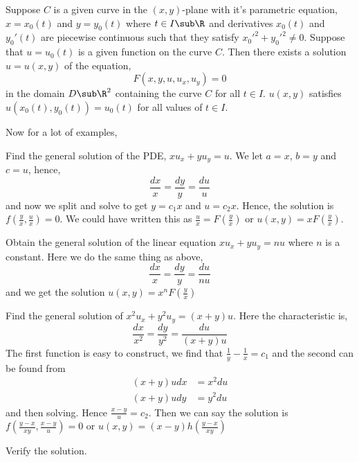 
\begin{nthm}
  Suppose $C$ is a given curve in the $(x, y)$-plane with it's parametric equation, $x = x_0(t)$ and $y = y_0(t)$ where $t \in I \sub \R$ and derivatives $x_0(t)$ and $y_0'(t)$ are piecewise continuous such that they satisfy $x_0'^2 + y_0'^2 \ne 0$. Suppose that $u = u_0(t)$ is a given function on the curve $C$. Then there exists a solution $u = u(x, y)$ of the equation,
  $$ F(x, y, u, u_x, u_y) = 0 $$
  in the domain $D \sub \R^2$ containing the curve $C$ for all $t \in I$. $u(x, y)$ satisfies $u(x_0(t), y_0(t)) = u_0(t)$ for all values of $t \in I$.
\end{nthm}

Now for a lot of examples,
\begin{eg}
  Find the general solution of the PDE, $xu_x + yu_y = u$. We let $a = x$, $b = y$ and $c = u$, hence,
  $$ \frac{dx}{x} = \frac{dy}{y} = \frac{du}{u} $$
  and now we split and solve to get $y = c_1x$ and $u = c_2x$. Hence, the solution is $f\left( \frac{y}{x}, \frac{u}{x} \right) = 0$. We could have written this as $\frac{u}{x} = F\left( \frac{y}{x} \right)$ or $u(x, y) = xF\left( \frac{y}{x} \right)$.
\end{eg}

\begin{eg}
  Obtain the general solution of the linear equation $xu_x + yu_y = nu$ where $n$ is a constant. Here we do the same thing as above,
  $$ \frac{dx}{x} = \frac{dy}{y} = \frac{du}{nu} $$
  and we get the solution $u(x, y) = x^nF\left( \frac{y}{x} \right)$
\end{eg}

\begin{eg}
  Find the general solution of $x^2u_x + y^2u_y = (x + y)u$. Here the characteristic is,
  $$ \frac{dx}{x^2} = \frac{dy}{y^2} = \frac{du}{(x + y)u}$$
  The first function is easy to construct, we find that $\frac{1}{y} - \frac{1}{x} = c_1$ and the second can be found from
  \begin{align}
    (x + y)udx &= x^2du \\
    (x + y)udy &= y^2du
  \end{align}
  and then solving. Hence $\frac{x-y}{u} = c_2$. Then we can say the solution is $f(\frac{y - x}{xy}, \frac{x - y}{u}) = 0$ or $u(x, y) = (x - y)h(\frac{y - x}{xy})$
\end{eg}
\begin{exercise}
  Verify the solution.
\end{exercise}

